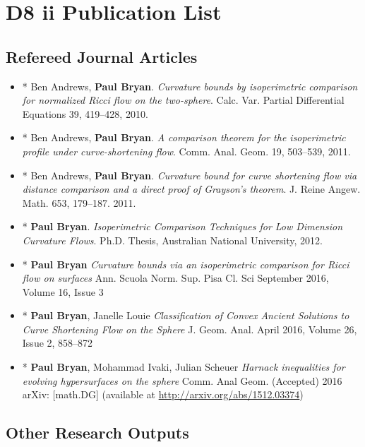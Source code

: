 \documentclass[12pt]{article}
\author{Paul Bryan}
\date{\today}
\title{}
\begin{document}
\tableofcontents

\section{D8 ii Publication List}
\label{sec:orgheadline3}
\subsection{Refereed Journal Articles}
\label{sec:orgheadline1}

\begin{itemize}
\item * Ben Andrews, \textbf{Paul Bryan}. \emph{Curvature bounds by isoperimetric comparison for normalized Ricci flow on the two-sphere}. Calc. Var. Partial Differential Equations 39, 419--428, 2010.
\item * Ben Andrews, \textbf{Paul Bryan}. \emph{A comparison theorem for the isoperimetric profile under curve-shortening flow}. Comm. Anal. Geom. 19, 503--539, 2011.
\item * Ben Andrews, \textbf{Paul Bryan}. \emph{Curvature bound for curve shortening flow via distance comparison and a direct proof of Grayson's theorem}. J. Reine Angew. Math. 653, 179--187. 2011.
\item * \textbf{Paul Bryan}. \emph{Isoperimetric Comparison Techniques for Low Dimension Curvature Flows}. Ph.D. Thesis, Australian National University, 2012.
\item * \textbf{Paul Bryan} \emph{Curvature bounds via an isoperimetric comparison for Ricci flow on surfaces} Ann. Scuola Norm. Sup. Pisa Cl. Sci September 2016, Volume 16, Issue 3
\item * \textbf{Paul Bryan}, Janelle Louie \emph{Classification of Convex Ancient Solutions to Curve Shortening Flow on the Sphere} J. Geom. Anal. April 2016, Volume 26, Issue 2, 858--872
\item * \textbf{Paul Bryan}, Mohammad Ivaki, Julian Scheuer \emph{Harnack inequalities for evolving hypersurfaces on the sphere} Comm. Anal Geom. (Accepted) 2016 arXiv: [math.DG] (available at \url{http://arxiv.org/abs/1512.03374})
\end{itemize}

\subsection{Other Research Outputs}
\label{sec:orgheadline2}
\end{document}
